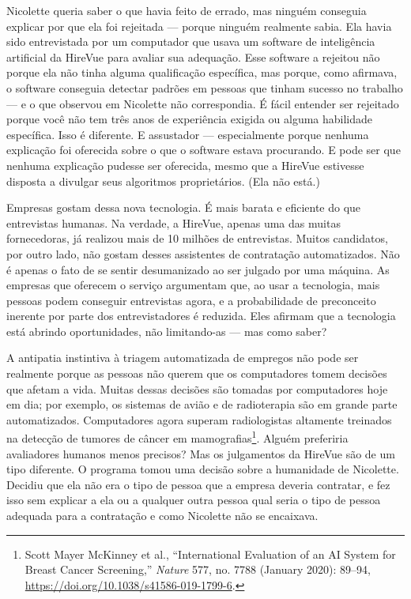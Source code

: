 Nicolette queria saber o que havia feito de errado, mas ninguém conseguia 
explicar por que ela foi rejeitada --- porque ninguém realmente sabia. Ela havia 
sido entrevistada por um computador que usava um software de inteligência 
artificial da HireVue para avaliar sua adequação. Esse software a rejeitou não 
porque ela não tinha alguma qualificação específica, mas porque, como afirmava, 
o software conseguia detectar padrões em pessoas que tinham sucesso no trabalho 
--- e o que observou em Nicolette não correspondia. É fácil entender ser 
rejeitado porque você não tem três anos de experiência exigida ou alguma 
habilidade específica. Isso é diferente. E assustador --- especialmente porque 
nenhuma explicação foi oferecida sobre o que o software estava procurando. E 
pode ser que nenhuma explicação pudesse ser oferecida, mesmo que a HireVue 
estivesse disposta a divulgar seus algoritmos proprietários. (Ela não está.)

Empresas gostam dessa nova tecnologia. É mais barata e eficiente do que 
entrevistas humanas. Na verdade, a HireVue, apenas uma das muitas fornecedoras, 
já realizou mais de 10 milhões de entrevistas. Muitos candidatos, por outro 
lado, não gostam desses assistentes de contratação automatizados. Não é apenas o 
fato de se sentir desumanizado ao ser julgado por uma máquina. As empresas que 
oferecem o serviço argumentam que, ao usar a tecnologia, mais pessoas podem 
conseguir entrevistas agora, e a probabilidade de preconceito inerente por parte 
dos entrevistadores é reduzida. Eles afirmam que a tecnologia está abrindo 
oportunidades, não limitando-as --- mas como saber?

A antipatia instintiva à triagem automatizada de empregos não pode ser realmente 
porque as pessoas não querem que os computadores tomem decisões que afetam a 
vida. Muitas dessas decisões são tomadas por computadores hoje em dia; por 
exemplo, os sistemas de avião e de radioterapia são em grande parte 
automatizados. Computadores agora superam radiologistas altamente treinados na 
detecção de tumores de câncer em mamografias\footnote{Scott Mayer McKinney et
al., ``International Evaluation of an AI System for Breast Cancer Screening,''
\textit{Nature} 577, no. 7788 (January 2020): 89--94, \url{https://doi.org/10.1038/s41586-019-1799-6}.}. Alguém preferiria avaliadores humanos menos precisos? Mas os julgamentos da 
HireVue são de um tipo diferente. O programa tomou uma decisão sobre a 
humanidade de Nicolette. Decidiu que ela não era o tipo de pessoa que a empresa 
deveria contratar, e fez isso sem explicar a ela ou a qualquer outra pessoa qual
seria o tipo de pessoa adequada para a contratação e como Nicolette não se 
encaixava.

